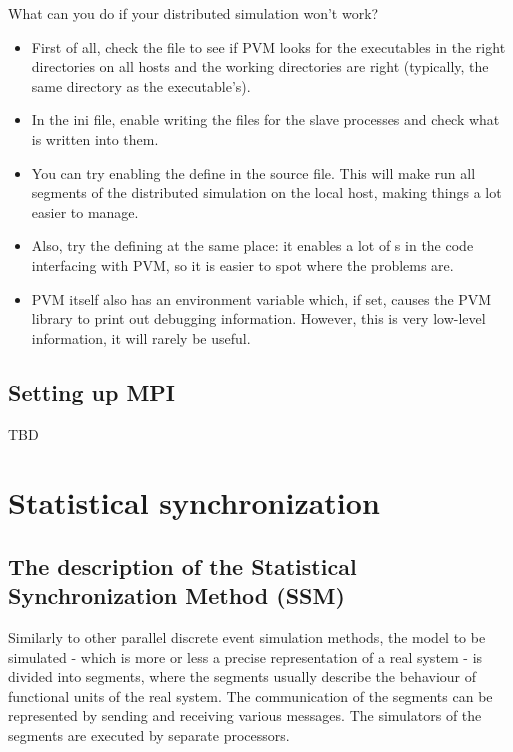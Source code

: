 What can you do if your distributed {\opp} simulation won't
work?
\begin{itemize}
  \item{First of all, check the  file to see if PVM
    looks for the executables in the right directories on all hosts
    and the working directories are right (typically, the same
    directory as the executable's).}
  \item{In the ini file, enable writing the  files for
    the slave processes and check what is written into them.}
  \item{You can try enabling the  define in the
     source file. This will make {\opp} run all
    segments of the distributed simulation on the local host, making
    things a lot easier to manage. }
  \item{Also, try the defining  at the same place: it
    enables a lot of s in the code interfacing with
    PVM, so it is easier to spot where the problems are.}
  \item{PVM itself also has an environment variable which, if set,
    causes the PVM library to print out debugging information.
    However, this is very low-level information, it will rarely be
    useful.}
\end{itemize}




\subsection{Setting up MPI}

TBD





\section{Statistical synchronization}
\begin{sloppypar}
\subsection{The description of the Statistical Synchronization Method (SSM)}
\end{sloppypar}

Similarly to other parallel discrete event simulation methods, the
model to be simulated - which is more or less a precise representation
of a real system - is divided into segments, where the segments
usually describe the behaviour of functional units of the real system.
The communication of the segments can be represented by sending and
receiving various messages. The simulators of the segments are
executed by separate processors.


